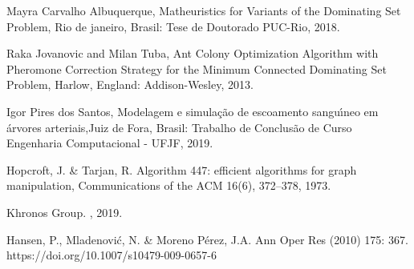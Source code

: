 \documentclass[conference,compsoc]{IEEEtran}
\begin{document}
\newpage
\clearpage
\newpage








%
%
%
\begin{thebibliography}{1}

Mayra Carvalho Albuquerque, Matheuristics for Variants of the
Dominating Set Problem, Rio de janeiro, Brasil: Tese de Doutorado PUC-Rio, 2018.

Raka Jovanovic and Milan Tuba, Ant Colony Optimization Algorithm
with Pheromone Correction Strategy for
the Minimum Connected Dominating Set Problem, Harlow, England: Addison-Wesley, 2013.

Igor Pires dos Santos, Modelagem e simulação de escoamento
sanguı́neo em árvores arteriais,Juiz de Fora, Brasil: Trabalho de Conclusão de Curso Engenharia Computacional - UFJF, 2019.

Hopcroft, J. & Tarjan, R.  Algorithm 447: efficient algorithms for graph
manipulation, Communications of the ACM 16(6), 372–378, 1973.

Khronos Group.  , 2019.

Hansen, P., Mladenović, N. & Moreno Pérez, J.A. Ann Oper Res (2010) 175: 367. https://doi.org/10.1007/s10479-009-0657-6

\end{thebibliography}




\end{document}
